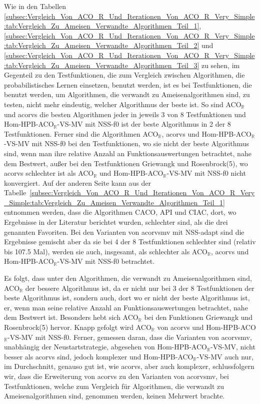 \documentclass[fontsize=12, a4aper]{scrartcl}
\begin{document}
	Wie in den Tabellen \ref{subsec:Vergleich_Von_ACO_R_Und_Iterationen_Von_ACO_R_Very_Simple:tab:Vergleich_Zu_Ameisen_Verwandte_Algorithmen_Teil_1}, \ref{subsec:Vergleich_Von_ACO_R_Und_Iterationen_Von_ACO_R_Very_Simple:tab:Vergleich_Zu_Ameisen_Verwandte_Algorithmen_Teil_2} und \ref{subsec:Vergleich_Von_ACO_R_Und_Iterationen_Von_ACO_R_Very_Simple:tab:Vergleich_Zu_Ameisen_Verwandte_Algorithmen_Teil_3} zu sehen, im Gegenteil zu den Testfunktionen, die zum Vergleich zwischen Algorithmen, die probabilistisches Lernen einsetzen, benutzt werden, ist es bei Testfunktionen, die benutzt werden, um Algorithmen, die verwandt zu Ameisenalgorithmen sind, zu testen, nicht mehr eindeutig, welcher Algorithmus der beste ist. So sind ACO\(_\mathbb{R}\) und \ac{acorvs} die besten Algorithmen jeder in jeweils 3 von 8 Testfunktionen und Hom-HPB-ACO\(_\mathbb{R}\)-VS-MV mit NSS-f0 ist der beste Algorithmus in 2 der 8 Testfunktionen. Ferner sind die Algorithmen ACO\(_\mathbb{R}\), \ac{acorvs} und Hom-HPB-ACO\(_\mathbb{R}\)-VS-MV mit NSS-f0 bei den Testfunktionen, wo sie nicht der beste Algorithmus sind, wenn man ihre relative Anzahl an Funktionsauswertungen betrachtet, nahe dem Bestwert, außer bei den Testfunktionen \glqq Griewangk\grqq{} und \glqq Rosenbrock(5)\grqq, wo \ac{acorvs} schlechter ist als ACO\(_\mathbb{R}\) und Hom-HPB-ACO\(_\mathbb{R}\)-VS-MV mit NSS-f0 nicht konvergiert. Auf der anderen Seite kann aus der Tabelle~\ref{subsec:Vergleich_Von_ACO_R_Und_Iterationen_Von_ACO_R_Very_Simple:tab:Vergleich_Zu_Ameisen_Verwandte_Algorithmen_Teil_1} entnommen werden, dass die Algorithmen CACO, API und CIAC, dort, wo Ergebnisse in der Literatur berichtet wurden, schlechter sind, als die drei genannten Favoriten. Bei den Varianten von \ac{acorvsmv} mit NSS-adapt sind die Ergebnisse gemischt aber da sie bei 4 der 8 Testfunktionen schlechter sind (relativ bis 107.5 Mal), werden sie auch, insgesamt, als schlechter als ACO\(_\mathbb{R}\), \ac{acorvs} und Hom-HPB-ACO\(_\mathbb{R}\)-VS-MV mit NSS-f0 betrachtet.\hfill\newline
	
	Es folgt, dass unter den Algorithmen, die verwandt zu Ameisenalgorithmen sind, ACO\(_\mathbb{R}\) der bessere Algorithmus ist, da er nicht nur bei 3 der 8 Testfunktionen der beste Algorithmus ist, sondern auch, dort wo er nicht der beste Algorithmus ist, er, wenn man seine relative Anzahl an Funktionsauswertungen betrachtet, nahe dem Bestwert ist. Besonders hebt sich ACO\(_\mathbb{R}\) bei den Funktionen \glqq Griewangk\grqq{} und \glqq Rosenbrock(5)\grqq{} hervor. Knapp gefolgt wird ACO\(_\mathbb{R}\) von \ac{acorvs} und Hom-HPB-ACO\(_\mathbb{R}\)-VS-MV mit NSS-f0. Ferner, gemessen daran, dass die Varianten von \ac{acorvsmv}, unabhängig der Neustartstrategie, abgesehen von Hom-HPB-ACO\(_\mathbb{R}\)-VS-MV, nicht besser als \ac{acorvs} sind, jedoch komplexer und Hom-HPB-ACO\(_\mathbb{R}\)-VS-MV auch nur, im Durchschnitt, genauso gut ist, wie \ac{acorvs}, aber auch komplexer, schlussfolgern wir, dass die Erweiterung von \ac{acorvs} zu den Varianten von \ac{acorvsmv}, bei Testfunktionen, welche zum Vergleich für Algorithmen, die verwandt zu Ameisenalgorithmen sind, genommen werden, keinen Mehrwert brachte.
	
\end{document}
